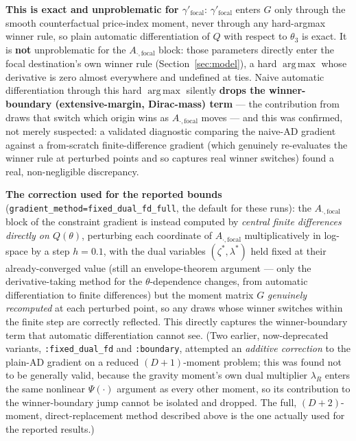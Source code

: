 \documentclass[11pt]{article}
\DeclareMathOperator*{\argmax}{arg\,max}
\begin{document}
\textbf{This is exact and unproblematic for $\gamma'_{\text{focal}}$}: $\gamma'_{\text{focal}}$ enters
$G$ only through the smooth counterfactual price-index moment, never through any hard-argmax
winner rule, so plain automatic differentiation of $Q$ with respect to $\theta_3$ is exact. It is
\textbf{not} unproblematic for the $A_{\cdot,\text{focal}}$ block: those parameters directly enter
the focal destination's own winner rule (Section~\ref{sec:model}), a hard $\argmax$ whose
derivative is zero almost everywhere and undefined at ties. Naive automatic differentiation through
this hard $\argmax$ silently \textbf{drops the winner-boundary (extensive-margin, Dirac-mass) term}
— the contribution from draws that switch which origin wins as $A_{\cdot,\text{focal}}$ moves — and
this was confirmed, not merely suspected: a validated diagnostic comparing the naive-AD gradient
against a from-scratch finite-difference gradient (which genuinely re-evaluates the winner rule at
perturbed points and so captures real winner switches) found a real, non-negligible discrepancy.

\textbf{The correction used for the reported bounds} (\texttt{gradient\_method=fixed\_dual\_fd\_full},
the default for these runs): the $A_{\cdot,\text{focal}}$ block of the constraint gradient is instead
computed by \emph{central finite differences directly on $Q(\theta)$}, perturbing each coordinate of
$A_{\cdot,\text{focal}}$ multiplicatively in log-space by a step $h=0.1$, with the dual variables
$(\zeta^*,\lambda^*)$ held fixed at their already-converged value (still an envelope-theorem
argument — only the derivative-taking method for the $\theta$-dependence changes, from automatic
differentiation to finite differences) but the moment matrix $G$ \emph{genuinely recomputed} at each
perturbed point, so any draws whose winner switches within the finite step are correctly reflected.
This directly captures the winner-boundary term that automatic differentiation cannot see. (Two
earlier, now-deprecated variants, \texttt{:fixed\_dual\_fd} and \texttt{:boundary}, attempted an
\emph{additive correction} to the plain-AD gradient on a reduced $(D+1)$-moment problem; this was
found not to be generally valid, because the gravity moment's own dual multiplier $\lambda_R$ enters
the same nonlinear $\Psi(\cdot)$ argument as every other moment, so its contribution to the
winner-boundary jump cannot be isolated and dropped. The full, $(D+2)$-moment, direct-replacement
method described above is the one actually used for the reported results.)
\end{document}
